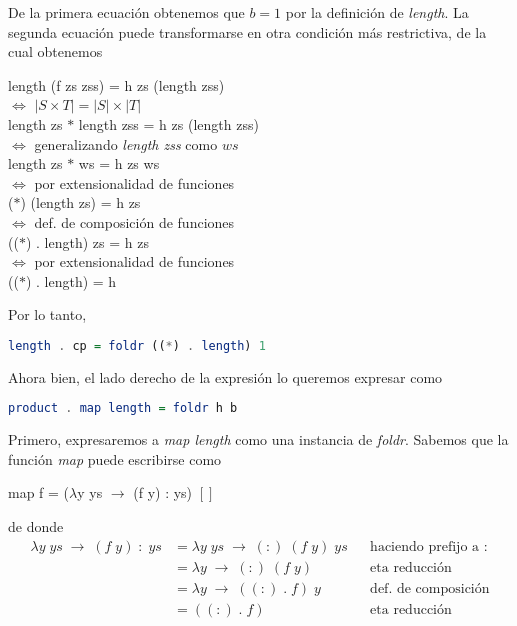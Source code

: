 \documentclass[letterpaper,11pt]{article}
\begin{document}
\begin{enumerate}
\begin{itemize}
        De la primera ecuación obtenemos que $b = 1$ por la definición de 
        \textit{length}. La segunda ecuación puede transformarse en otra 
        condición más restrictiva, de la cual obtenemos
        \begin{center}
            length (f zs zss) = h zs (length zss) \\
            $\Leftrightarrow$ $|S \times T| = |S| \times |T|$ \\
            length zs $*$ length zss = h zs (length zss) \\
            $\Leftrightarrow$ generalizando \textit{length zss} como $ws$ \\
            length zs $*$ ws = h zs ws \\
            $\Leftrightarrow$ por extensionalidad de funciones \\
            ($*$) (length zs) = h zs \\
            $\Leftrightarrow$ def. de composición de funciones \\
            (($*$) . length) zs = h zs \\
            $\Leftrightarrow$ por extensionalidad de funciones \\
            (($*$) . length) = h 
        \end{center}
        
        Por lo tanto, 
        \begin{lstlisting}[language=Haskell]
            length . cp = foldr ((*) . length) 1
        \end{lstlisting}

        Ahora bien, el lado derecho de la expresión lo queremos expresar como 
        \begin{lstlisting}[language=Haskell]
            product . map length = foldr h b
        \end{lstlisting}
        
        Primero, expresaremos a \textit{map length} como una instancia de 
        \textit{foldr}. Sabemos que la función \textit{map} puede escribirse
        como
        \begin{center}
            map f = ($\lambda$y ys $\rightarrow$ (f y) : ys) $[]$
        \end{center}
        
        de donde 
        \begin{align*}
            \lambda y \; ys \; \rightarrow \; (f \; y) \; : \; ys
            &= \lambda y \; ys \; \rightarrow \; (:) \; (f \; y) \; ys
            && \text{haciendo prefijo a $:$} \\
            &= \lambda y  \; \rightarrow \; (:) \; (f \; y) 
            && \text{eta reducción} \\
            &= \lambda y \; \rightarrow \; ((:) \; . \; f) \; y
            && \text{def. de composición} \\ 
            &= ((:) \; . \; f)
            && \text{eta reducción}
        \end{align*}
        

\end{itemize}
\end{enumerate}
\end{document}
